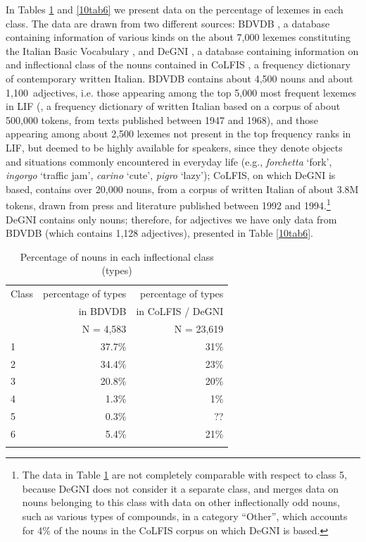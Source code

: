 \documentclass[output=paper,colorlinks,citecolor=brown]{langscibook}
\begin{document}
In Tables \ref{10tab5} and \ref{10tab6} we present data on the percentage of lexemes in each class. The data are drawn from two different sources: BDVDB \citep{thorntoniacobiniburani1997}, a database containing information of various kinds on the about 7,000 lexemes constituting the Italian Basic Vocabulary \citep{demauro1989}, and DeGNI \citep{demartinobraccolaudanna2023}, a database containing information on  and inflectional class of the nouns contained in CoLFIS \citep{bertinettoburanilaudannamarconirattirolandothornton2005}, a frequency dictionary of contemporary written Italian. BDVDB contains about 4,500 nouns and about 1,100~adjectives, i.e. those appearing among the top 5,000 most frequent lexemes in LIF (\citealt{bortolinitagliavinizampolli1971}, a frequency dictionary of written Italian based on a corpus of about 500,000 tokens, from texts published between 1947 and 1968), and those appearing among about 2,500 lexemes not present in the top frequency ranks in LIF, but deemed to be highly available for speakers, since they denote objects and situations commonly encountered in everyday life (e.g., \emph{forchetta} `fork', \emph{ingorgo} `traffic jam', \emph{carino} `cute', \emph{pigro} `lazy'); CoLFIS, on which DeGNI is based, contains over 20,000 nouns, from a corpus of written Italian of about 3.8M tokens, drawn from press and literature published between 1992 and 1994.\footnote{The data in Table \ref{10tab5} are not completely comparable with respect to class 5, because DeGNI does not consider it a separate class, and merges data on nouns belonging to this class with data on other inflectionally odd nouns, such as various types of compounds, in a category ``Other'', which accounts for 4\% of the nouns in the CoLFIS corpus on which DeGNI is based.} DeGNI contains only nouns; therefore, for adjectives we have only data from BDVDB (which contains 1,128 adjectives), presented in Table \ref{10tab6}.

\begin{table}[ht]
	\centering
	\begin{tabularx}{0.7\textwidth}{lrr}
		\lsptoprule
			Class & percentage of types & percentage of types \\
			& in BDVDB & in CoLFIS / DeGNI \\
			& N = 4,583 & N = 23,619 \\
			\midrule
			1 & 37.7\% & 31\% \\
			2 & 34.4\% & 23\% \\
			3 & 20.8\% & 20\% \\
			4 & 1.3\% & 1\% \\
			5 & 0.3\% & ?? \\
			\rowcolor{gray!25}
			6 & 5.4\% & 21\% \\
		\lspbottomrule
	\end{tabularx}
	\caption{Percentage of nouns in each inflectional class (types)}
	\label{10tab5}
\end{table}
\end{document}
